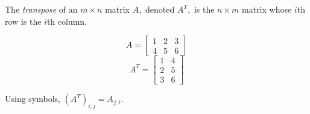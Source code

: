 \begin{definition}
    The \emph{transpose} of an \(m \times n\) matrix \(A,\) denoted \(A^T,\) is the \(n \times m\) matrix whose \(i\)th row is the \(i\)th column.
\end{definition}

\begin{example}
    \[A = \begin{bmatrix}
        1 & 2& 3 \\
        4 & 5 & 6
    \end{bmatrix}\]
    \[A^T = \begin{bmatrix}
        1 & 4 \\
        2 & 5 \\
        3 & 6
    \end{bmatrix}\]
\end{example}

Using symbols, \(\left(A^{T}\right)_{i,j} = A_{j,i}.\)